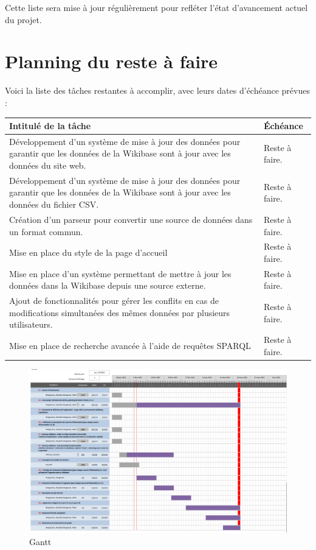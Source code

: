 \documentclass[a4paper, 12pt]{article}
\begin{document}
Cette liste sera mise à jour régulièrement pour refléter l'état d'avancement actuel du projet.

\newpage
\section{Planning du reste à faire}

Voici la liste des tâches restantes à accomplir, avec leurs dates d'échéance prévues :

\begin{tabular}{|p{14cm}|p{3cm}|}
\hline
\rowcolor[HTML]{EFEFEF}
Intitulé de la tâche & Échéance \\
\hline
Développement d'un système de mise à jour des données pour garantir que les données de la Wikibase sont à jour avec les données du site web. & Reste à faire. \\
\hline Développement d'un système de mise à jour des données pour garantir que les données de la Wikibase sont à jour avec les données du fichier CSV. & Reste à faire. \\
\hline Création d'un parseur pour convertir une source de données dans un format commun. & Reste à faire. \\
\hline Mise en place du style de la page d'accueil & Reste à faire. \\
\hline Mise en place d'un système permettant de mettre à jour les données dans la Wikibase depuis une source externe. & Reste à faire. \\ 
\hline Ajout de fonctionnalités pour gérer les conflits en cas de modifications simultanées des mêmes données par plusieurs utilisateurs. & Reste à faire. \\ 
\hline
Mise en place de recherche avancée à l'aide de requêtes SPARQL & Reste à faire. \\

\hline
\end{tabular}


\begin{figure}[h]
    \centering
    \includegraphics[scale=0.5]{diagramme.png}
    \caption{Gantt}
    \label{fig:my_label}
\end{figure}
\end{document}
